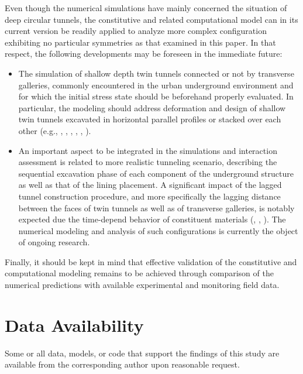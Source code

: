 \documentclass[Journal,letterpaper, NoLists,SectionNumbers]{ascelike-new}
\begin{document}
Even though the numerical simulations have mainly concerned the situation of deep circular tunnels, the constitutive and related computational model can in its current version be readily applied to analyze more complex configuration exhibiting no particular symmetries as that examined in this paper. In that respect, the following developments may be foreseen in the immediate future:

\begin{itemize}
	
	\item The simulation of shallow depth twin tunnels connected or not by transverse galleries, commonly encountered in the urban underground environment and for which the initial stress state should be beforehand properly evaluated. In particular, the modeling should address deformation and design of shallow twin tunnels excavated in horizontal parallel profiles or stacked over each other (e.g., , , , , ,  ).

	\item An important aspect to be integrated in the simulations and interaction assessment is related to more realistic tunneling scenario, describing the sequential excavation phase of each component of the underground structure as well as that of the lining placement. A significant impact of the lagged tunnel construction procedure, and more specifically the lagging distance between the faces of twin tunnels as well as of transverse galleries, is notably expected due the time-depend behavior of constituent materials (, , ). The numerical modeling and analysis of such configurations is currently the object of ongoing research.
	
\end{itemize}

Finally, it should be kept in mind that effective validation of the constitutive and computational modeling remains to be achieved through comparison of the numerical predictions with available experimental and monitoring field data.

\section{Data Availability}\label{}

Some or all data, models, or code that support the findings of this study are available from the corresponding author upon reasonable request.

%
%

%
\end{document}
